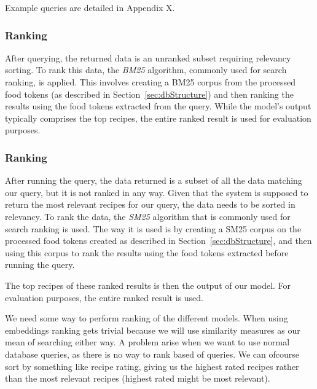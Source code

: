 \documentclass[11pt]{article}
\begin{document}
Example queries are detailed in Appendix X.

\subsubsection{Ranking}
After querying, the returned data is an unranked subset requiring relevancy
sorting.
To rank this data, the \emph{BM25} algorithm, commonly used for search ranking,
is applied.
This involves creating a BM25 corpus from the processed food tokens (as
described in Section~\ref{sec:dbStructure}) and then ranking the results using
the food tokens extracted from the query.
While the model's output typically comprises the top recipes, the entire ranked
result is used for evaluation purposes.

\subsubsection{Ranking}
After running the query, the data returned is a subset of all the data matching
our query, but it is not ranked in any way.
Given that the system is supposed to return the most relevant recipes for our
query, the data needs to be sorted in relevancy.
To rank the data, the \emph{SM25} algorithm that is commonly used for search
ranking is used.
The way it is used is by creating a SM25 corpus on the processed food tokens
created as described in Section~\ref{sec:dbStructure}, and then using this
corpus to rank the results using the food tokens extracted before running the
query.

The top recipes of these ranked results is then the output of our model.
For evaluation purposes, the entire ranked result is used.


\iffalse{}
We need some way to perform ranking of the different models.
When using embeddings ranking gets trivial because we will use similarity
measures as our mean of searching either way.
A problem arise when we want to use normal database queries, as there is no way
to rank based of queries.
We can ofcourse sort by something like recipe rating, giving us the highest
rated recipes rather than the most relevant recipes (highest rated might be most
relevant).
\end{document}
